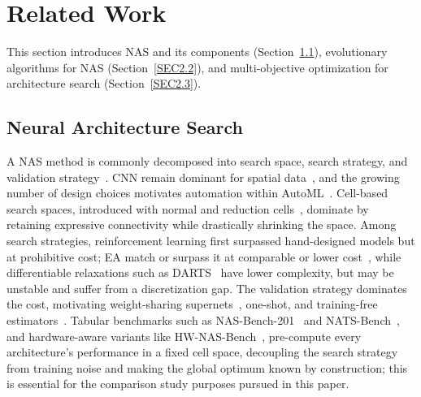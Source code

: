 \documentclass[runningheads]{llncs}
\begin{document}

\section{Related Work} \label{SEC2}
\noindent This section introduces NAS and its components (Section~\ref{SEC2.1}), evolutionary algorithms for NAS (Section~\ref{SEC2.2}), and multi-objective optimization for architecture search (Section~\ref{SEC2.3}).

%
%
\subsection{Neural Architecture Search} \label{SEC2.1}
A NAS method is commonly decomposed into search space, search strategy, and validation strategy~\cite{avval2025systematic}. CNN remain dominant for spatial data~\cite{lecun1998gradient,younesi2024convolutions}, and the growing number of design choices motivates automation within AutoML~\cite{he2019automl}. Cell-based search spaces, introduced with normal and reduction cells~\cite{zoph2018nasnet}, dominate by retaining expressive connectivity while drastically shrinking the space. Among search strategies, reinforcement learning first surpassed hand-designed models but at prohibitive cost; EA match or surpass it at comparable or lower cost~\cite{avval2025systematic}, while differentiable relaxations such as DARTS~\cite{liu2019darts} have lower complexity, but may be unstable and suffer from a discretization gap. The validation strategy dominates the cost, motivating weight-sharing supernets~\cite{cai2020ofa}, one-shot, and training-free estimators~\cite{mellor2021nwot}. Tabular benchmarks such as NAS-Bench-201~\cite{dong2020nasbench201} and NATS-Bench~\cite{dong2021natsbench}, and hardware-aware variants like HW-NAS-Bench~\cite{li2021hwnasbench}, pre-compute every architecture's performance in a fixed cell space, decoupling the search strategy from training noise and making the global optimum known by construction; this is essential for the 
comparison study purposes pursued in this paper.


%
%
\end{document}
